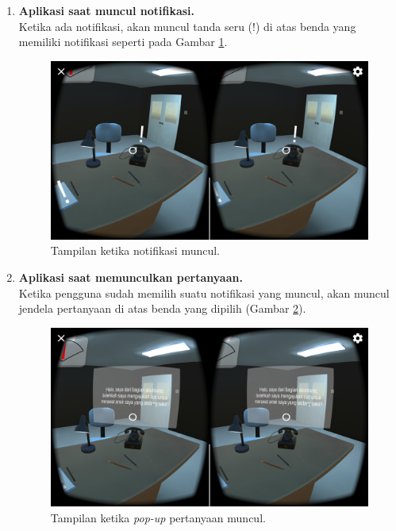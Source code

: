 \begin{enumerate}
    \item \textbf{Aplikasi saat muncul notifikasi.}\\
    Ketika ada notifikasi, akan muncul tanda seru (!) di atas benda yang memiliki notifikasi seperti pada Gambar \ref{fig:ss_notifikasi}.
    
    \begin{figure}[htbp]
    \centering
    \includegraphics[scale=0.23]{Gambar/screenshot-aplikasi/muncul-notifikasi.png}
    \caption{Tampilan ketika notifikasi muncul.} 
    \label{fig:ss_notifikasi}
    \end{figure}
    
    \item \textbf{Aplikasi saat memunculkan pertanyaan.}\\
    Ketika pengguna sudah memilih suatu notifikasi yang muncul, akan muncul jendela pertanyaan di atas benda yang dipilih (Gambar \ref{fig:ss_pop_up}). 
    
    \begin{figure}[htbp]
    \centering
    \includegraphics[scale=0.23]{Gambar/screenshot-aplikasi/pop-up.png}
    \caption{Tampilan ketika \textit{pop-up} pertanyaan muncul.} 
    \label{fig:ss_pop_up}
    \end{figure}
    

\end{enumerate}
